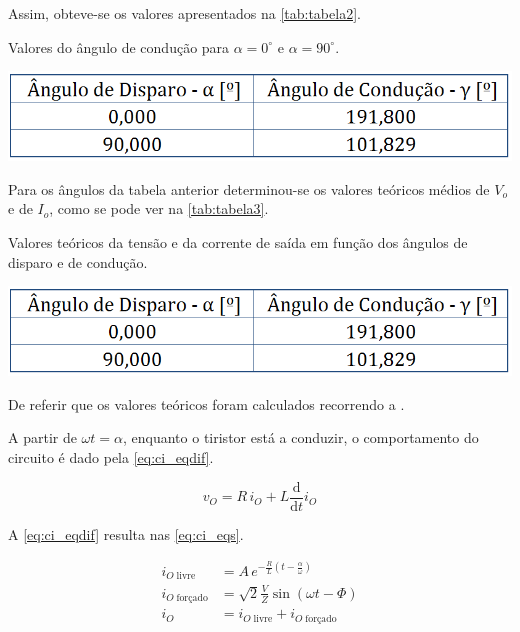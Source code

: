 \documentclass[a4paper,11pt]{article}
\numberwithin{equation}{section}
\begin{document}
Assim, obteve-se os valores apresentados na \autoref{tab:tabela2}.

\begin{table}[!htb]
	\centering
	\caption{Valores do ângulo de condução para $\alpha = 0^{\circ}$ e $\alpha = 90^{\circ}$.}
	\vspace{-3mm}
	\includegraphics[width=0.5\linewidth]{teoricas/tabela2}
	\label{tab:tabela2}
\end{table}

Para os ângulos da tabela anterior determinou-se os valores teóricos médios de $V_o$ e de $I_o$, como se pode ver na \autoref{tab:tabela3}.

\begin{table}[!htb]
	\centering
	\caption{Valores teóricos da tensão e da corrente de saída em função dos ângulos de disparo e de condução.}
	\vspace{-3mm}
	\includegraphics[width=0.5\linewidth]{teoricas/tabela2}
	\label{tab:tabela3}
\end{table}

De referir que os valores teóricos foram calculados recorrendo a .

A partir de $\omega t = \alpha$, enquanto o tiristor está a conduzir, o comportamento do circuito é dado pela \autoref{eq:ci_eqdif}.

\begin{equation}
\label{eq:ci_eqdif}
v_O = R\,i_{O} + L \frac{\mathrm{d}}{\mathrm{d}t}i_O
\end{equation}

A \autoref{eq:ci_eqdif} resulta nas \autoref{eq:ci_eqs}.

\begin{subequations}
\label{eq:ci_eqs}
\begin{align}
i_{O\;\text{livre}} &= A\,e^{-\frac{R}{L}(t - \frac{\alpha}{\omega})}\\
i_{O\;\text{forçado}} &= \sqrt{2} \frac{V}{Z} \sin{(\omega t - \Phi)}\\
i_O &= i_{O\;\text{livre}} + i_{O\;\text{forçado}}
\end{align}
\end{subequations}
\end{document}
